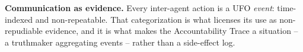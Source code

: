\documentclass[runningheads]{llncs}
\begin{document}
\textbf{Communication as evidence.} Every inter-agent action is a UFO \emph{event}: time-indexed and non-repeatable. That categorization is what licenses its use as non-repudiable evidence, and it is what makes the Accountability Trace a situation -- a truthmaker aggregating events -- rather than a side-effect log.

\end{document}

